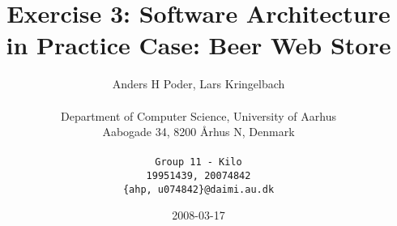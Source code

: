 
\title{Exercise 3: Software Architecture in Practice Case: Beer Web Store}

\author{
  Anders H Poder, Lars Kringelbach\\\\
  Department of Computer Science, University of Aarhus\\
  Aabogade 34, 8200 {\AA}rhus N, Denmark\\\\
  \makeatletter
  \texttt{Group 11 - Kilo}\\
  \texttt{19951439, 20074842}\\
  \texttt{\{ahp, u074842\}@daimi.au.dk}
}

\date{2008-03-17}

\maketitle










